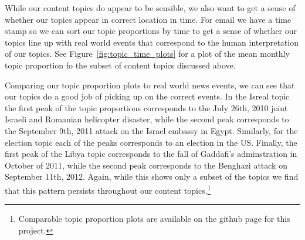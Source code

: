 \documentclass[12pt]{article}
\theoremstyle{definition}
\theoremstyle{algodesc}
\begin{document}
While our content topics do appear to be sensible, we also want to get a sense of whether our topics appear in correct location in time.  For email we have a time stamp so we can sort our topic proportions by time to get a sense of whether our topics line up with real world events that correspond to the human interpretation of our topics.  See Figure~\ref{fig:topic_time_plots} for a plot of the mean monthly topic proportion fo the subset of content topics discussed above.

Comparing our topic proportion plots to real world news events, we can see that our topics do a good job of picking up on the correct events.  In the Isreal topic the first peak of the topic proportions corresponds to the July 26th, 2010 joint Israeli and Romanian helicopter disaster, while the second peak corresponds to the September 9th, 2011 attack on the Israel embassy in Egypt.  Similarly, for the election topic each of the peaks corresponds to an election in the US.  Finally, the first peak of the Libya topic corresponds to the fall of Gaddafi's adminstration in October of 2011, while the second peak corresponds to the Benghazi attack on September 11th, 2012.  Again, while this shows only a subset of the topics we find that this pattern persists throughout our content topics.\footnote{Comparable topic proportion plots are available on the github page for this project.}
\end{document}
